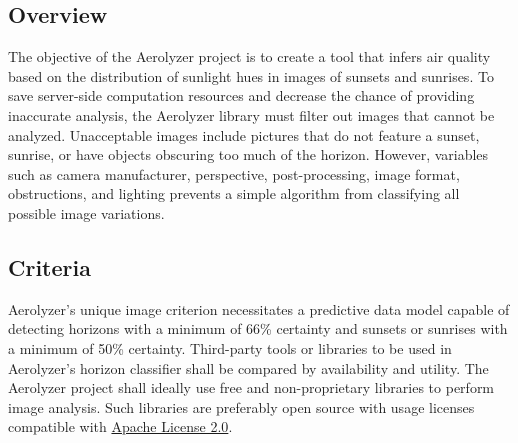 \documentclass[onecolumn, draftclsnofoot,10pt, compsoc]{IEEEtran}
\begin{document}
\begin{singlespace}
	\subsection{Overview}
		The objective of the Aerolyzer project is to create a tool that infers air quality based on the distribution of sunlight hues in images of sunsets and sunrises.
		To save server-side computation resources and decrease the chance of providing inaccurate analysis, the Aerolyzer library must filter out images that cannot be analyzed.
		Unacceptable images include pictures that do not feature a sunset, sunrise, or have objects obscuring too much of the horizon.
		However, variables such as camera manufacturer, perspective, post-processing, image format, obstructions, and lighting prevents a simple algorithm from classifying all possible image variations.
	
	\subsection{Criteria}
		Aerolyzer’s unique image criterion necessitates a predictive data model capable of detecting horizons with a minimum of 66\% certainty and sunsets or sunrises with a minimum of 50\% certainty.
		Third-party tools or libraries to be used in Aerolyzer’s horizon classifier shall be compared by availability and utility.
		The Aerolyzer project shall ideally use free and non-proprietary libraries to perform image analysis.
		Such libraries are preferably open source with usage licenses compatible with \href{https://www.apache.org/licenses/LICENSE-2.0}{Apache License 2.0}.




\end{singlespace}
\end{document}
